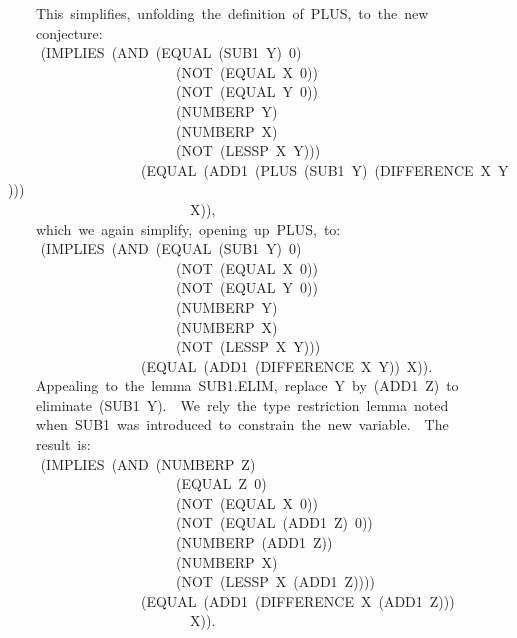 \documentclass[10pt]{book}
\newenvironment{pubasis}{\begin{flushleft}}{\end{flushleft}}
\begin{document}
\begin{pubasis}
~~~~This~simplifies,~unfolding~the~definition~of~PLUS,~to~the~new\\
~~~~conjecture:\\

~~	~~(IMPLIES~(AND~(EQUAL~(SUB1~Y)~0)\\
~~~~~~~~~~~~~~~~~~~~~~~~(NOT~(EQUAL~X~0))\\
~~~~~~~~~~~~~~~~~~~~~~~~(NOT~(EQUAL~Y~0))\\
~~~~~~~~~~~~~~~~~~~~~~~~(NUMBERP~Y)\\
~~~~~~~~~~~~~~~~~~~~~~~~(NUMBERP~X)\\
~~~~~~~~~~~~~~~~~~~~~~~~(NOT~(LESSP~X~Y)))\\
~~~~~~~~~~~~~~~~~~~(EQUAL~(ADD1~(PLUS~(SUB1~Y)~(DIFFERENCE~X~Y)))\\
~~~~~~~~~~~~~~~~~~~~~~~~~~X)),\\

~~~~which~we~again~simplify,~opening~up~PLUS,~to:\\

~~	~~(IMPLIES~(AND~(EQUAL~(SUB1~Y)~0)\\
~~~~~~~~~~~~~~~~~~~~~~~~(NOT~(EQUAL~X~0))\\
~~~~~~~~~~~~~~~~~~~~~~~~(NOT~(EQUAL~Y~0))\\
~~~~~~~~~~~~~~~~~~~~~~~~(NUMBERP~Y)\\
~~~~~~~~~~~~~~~~~~~~~~~~(NUMBERP~X)\\
~~~~~~~~~~~~~~~~~~~~~~~~(NOT~(LESSP~X~Y)))\\
~~~~~~~~~~~~~~~~~~~(EQUAL~(ADD1~(DIFFERENCE~X~Y))~X)).\\

~~~~Appealing~to~the~lemma~SUB1.ELIM,~replace~Y~by~(ADD1~Z)~to\\
~~~~eliminate~(SUB1~Y).~~We~rely~the~type~restriction~lemma~noted\\
~~~~when~SUB1~was~introduced~to~constrain~the~new~variable.~~The\\
~~~~result~is:\\

~~	~~(IMPLIES~(AND~(NUMBERP~Z)\\
~~~~~~~~~~~~~~~~~~~~~~~~(EQUAL~Z~0)\\
~~~~~~~~~~~~~~~~~~~~~~~~(NOT~(EQUAL~X~0))\\
~~~~~~~~~~~~~~~~~~~~~~~~(NOT~(EQUAL~(ADD1~Z)~0))\\
~~~~~~~~~~~~~~~~~~~~~~~~(NUMBERP~(ADD1~Z))\\
~~~~~~~~~~~~~~~~~~~~~~~~(NUMBERP~X)\\
~~~~~~~~~~~~~~~~~~~~~~~~(NOT~(LESSP~X~(ADD1~Z))))\\
~~~~~~~~~~~~~~~~~~~(EQUAL~(ADD1~(DIFFERENCE~X~(ADD1~Z)))\\
~~~~~~~~~~~~~~~~~~~~~~~~~~X)).\\


\end{pubasis}
\end{document}
